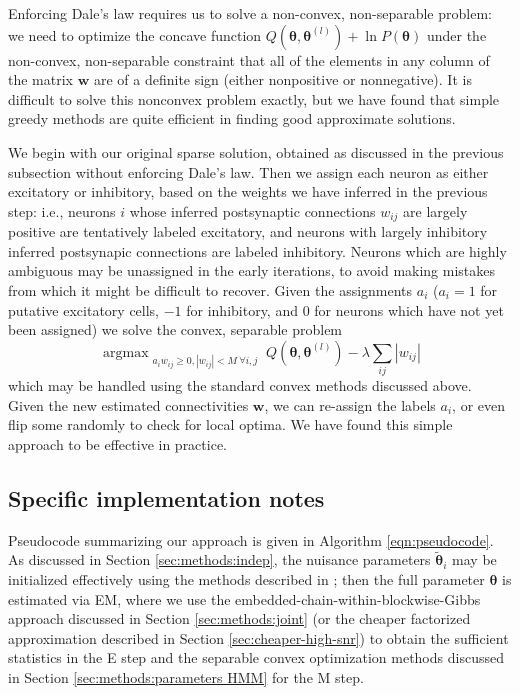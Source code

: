\documentclass[aoas,preprint]{imsart}
\newcommand{\bth}{\mathbf{\theta}}
\newcommand{\w}{w}
\newcommand{\bw}{\mathbf{\w}}
\DeclareMathOperator*{\argmax}{argmax}
\newcommand{\tbth}{\tilde{\bth}}
\begin{document}
Enforcing Dale's law requires us to solve a non-convex, non-separable problem: we need to optimize the concave function $Q(\bth,\bth^{(l)}) + \ln P(\bth)$ under the non-convex, non-separable constraint that all of the elements in any column of the matrix $\bw$ are of a definite sign (either nonpositive or nonnegative). It is difficult to solve this nonconvex problem exactly, but we have found that simple greedy methods are quite efficient in finding good approximate solutions.

We begin with our original sparse solution, obtained as discussed in the previous subsection without enforcing Dale's law. Then we assign each neuron as either excitatory or inhibitory, based on the weights we have inferred in the previous step: i.e., neurons $i$ whose inferred postsynaptic connections $w_{ij}$ are largely positive are tentatively labeled excitatory, and neurons with largely inhibitory inferred postsynapic connections are labeled inhibitory. Neurons which are highly ambiguous may be unassigned in the early iterations, to avoid making mistakes from which it might be difficult to recover. Given the assignments $a_i$ ($a_i =1$ for putative excitatory cells, $-1$ for inhibitory, and $0$ for neurons which have not yet been assigned) we solve the convex, separable problem \begin{equation} \argmax_{\substack{a_i \w_{ij} \geq 0, |w_{ij}|<M ~ \forall i,j}} Q(\bth,\bth^{(l)}) - \lambda \sum_{ij} |w_{ij}| \end{equation} which may be handled using the standard convex methods discussed above. Given the new estimated connectivities $\bw$, we can re-assign the labels $a_i$, or even flip some randomly to check for local optima. We have found this simple approach to be effective in practice.


\subsection{Specific implementation notes} \label{sec:methods:specific_implementation}

Pseudocode summarizing our approach is given in Algorithm \ref{eqn:pseudocode}. As discussed in Section \ref{sec:methods:indep}, the nuisance parameters $\tbth_i$ may be initialized effectively using the methods described in \cite{Vogelstein2009}; then the full parameter $\bth$ is estimated via EM, where we use the embedded-chain-within-blockwise-Gibbs approach discussed in Section \ref{sec:methods:joint} (or the cheaper factorized approximation described in Section \ref{sec:cheaper-high-snr}) to obtain the sufficient statistics in the E step and the separable convex optimization methods discussed in Section \ref{sec:methods:parameters HMM} for the M step.
\end{document}
